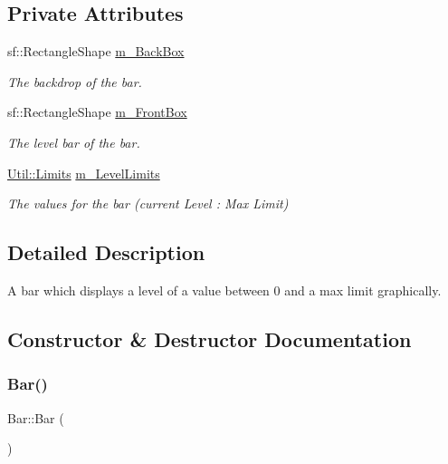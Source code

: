 \subsection*{Private Attributes}
\begin{DoxyCompactItemize}
\item 
sf\+::\+Rectangle\+Shape \hyperlink{class_bar_a8c71afcd6b5c23074533c9e7e594022e}{m\+\_\+\+Back\+Box}
\begin{DoxyCompactList}\small\item\em The backdrop of the bar. \end{DoxyCompactList}\item 
sf\+::\+Rectangle\+Shape \hyperlink{class_bar_abe5021e0743bd0ee58fad027b3f1d4c4}{m\+\_\+\+Front\+Box}
\begin{DoxyCompactList}\small\item\em The level bar of the bar. \end{DoxyCompactList}\item 
\hyperlink{struct_util_1_1_limits}{Util\+::\+Limits} \hyperlink{class_bar_a7977e8ba5b5c42c70a79aadb8474c3d7}{m\+\_\+\+Level\+Limits}
\begin{DoxyCompactList}\small\item\em The values for the bar (current Level \+: Max Limit) \end{DoxyCompactList}\end{DoxyCompactItemize}


\subsection{Detailed Description}
A bar which displays a level of a value between 0 and a max limit graphically. 

\subsection{Constructor \& Destructor Documentation}
\mbox{\label{class_bar_a9cae2188fcc6cce41caa7898c64548d1}} 
\subsubsection{\texorpdfstring{Bar()}{Bar()}}
{\footnotesize\ttfamily Bar\+::\+Bar (\begin{DoxyParamCaption}{ }\end{DoxyParamCaption})}



